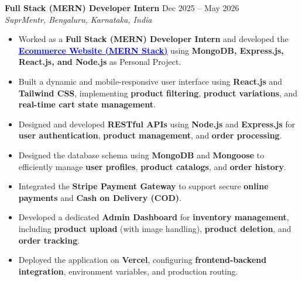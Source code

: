 \documentclass[letterpaper,11pt]{article}
\begin{document}
\begin{itemize}[leftmargin=0.15in, label={}]
\small{\item{
\textbf{Full Stack (MERN) Developer Intern} \hfill Dec 2025 -- May 2026 \\
\textit{SuprMentr, Bengaluru, Karnataka, India} \\
\vspace{-20pt}

\begin{itemize}
    \justifying

    \item Worked as a \textbf{Full Stack (MERN) Developer Intern} and developed the
    \textbf{\href{https://github.com/techwithsatish/ecommerce-website}{\textcolor{blue}{\underline{Ecommerce Website (MERN Stack)}}}}
    using \textbf{MongoDB, Express.js, React.js, and Node.js} as Personal Project.

    \item Built a dynamic and mobile-responsive user interface using \textbf{React.js} and \textbf{Tailwind CSS}, implementing \textbf{product filtering}, \textbf{product variations}, and \textbf{real-time cart state management}.

    \item Designed and developed \textbf{RESTful APIs} using \textbf{Node.js} and \textbf{Express.js} for \textbf{user authentication}, \textbf{product management}, and \textbf{order processing}.

    \item Designed the database schema using \textbf{MongoDB} and \textbf{Mongoose} to efficiently manage \textbf{user profiles}, \textbf{product catalogs}, and \textbf{order history}.

    \item Integrated the \textbf{Stripe Payment Gateway} to support secure \textbf{online payments} and \textbf{Cash on Delivery (COD)}.

    \item Developed a dedicated \textbf{Admin Dashboard} for \textbf{inventory management}, including \textbf{product upload} (with image handling), \textbf{product deletion}, and \textbf{order tracking}.

    \item Deployed the application on \textbf{Vercel}, configuring \textbf{frontend-backend integration}, environment variables, and production routing.

\end{itemize}

}}
\end{itemize}
\end{document}

